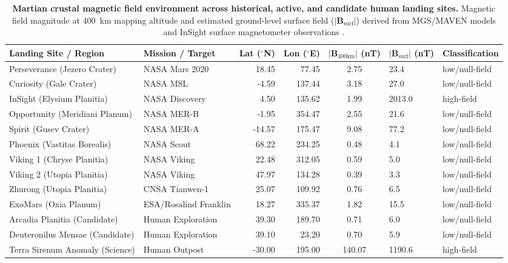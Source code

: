 \begin{table}[t]
\centering
\footnotesize
\caption{\textbf{Martian crustal magnetic field environment across historical, active, and candidate human landing sites.} Magnetic field magnitude at \SI{400}{\kilo\meter} mapping altitude and estimated ground-level surface field ($|\mathbf{B}_{\text{surf}}|$) derived from MGS/MAVEN models \citep{Langlais2019} and InSight surface magnetometer observations \citep{Johnson2020}.}
\label{tab:mars_landing_sites}
\begin{tabular}{llrrcll}
\toprule
\textbf{Landing Site / Region} & \textbf{Mission / Target} & \textbf{Lat ($^\circ$N)} & \textbf{Lon ($^\circ$E)} & \textbf{$|\mathbf{B}_{\text{400km}}|$ (nT)} & \textbf{$|\mathbf{B}_{\text{surf}}|$ (nT)} & \textbf{Classification} \\
\midrule
Perseverance (Jezero Crater) & NASA Mars 2020 & 18.45 & 77.45 & 2.75 & 23.4 & low/null-field \\
Curiosity (Gale Crater) & NASA MSL & -4.59 & 137.44 & 3.18 & 27.0 & low/null-field \\
InSight (Elysium Planitia) & NASA Discovery & 4.50 & 135.62 & 1.99 & 2013.0 & high-field \\
Opportunity (Meridiani Planum) & NASA MER-B & -1.95 & 354.47 & 2.55 & 21.6 & low/null-field \\
Spirit (Gusev Crater) & NASA MER-A & -14.57 & 175.47 & 9.08 & 77.2 & low/null-field \\
Phoenix (Vastitas Borealis) & NASA Scout & 68.22 & 234.25 & 0.48 & 4.1 & low/null-field \\
Viking 1 (Chryse Planitia) & NASA Viking & 22.48 & 312.05 & 0.59 & 5.0 & low/null-field \\
Viking 2 (Utopia Planitia) & NASA Viking & 47.97 & 134.28 & 0.39 & 3.3 & low/null-field \\
Zhurong (Utopia Planitia) & CNSA Tianwen-1 & 25.07 & 109.92 & 0.76 & 6.5 & low/null-field \\
ExoMars (Oxia Planum) & ESA/Rosalind Franklin & 18.27 & 335.37 & 1.82 & 15.5 & low/null-field \\
Arcadia Planitia (Candidate) & Human Exploration & 39.30 & 189.70 & 0.71 & 6.0 & low/null-field \\
Deuteronilus Mensae (Candidate) & Human Exploration & 39.10 & 23.20 & 0.70 & 5.9 & low/null-field \\
Terra Sirenum Anomaly (Science) & Human Outpost & -30.00 & 195.00 & 140.07 & 1190.6 & high-field \\
\bottomrule
\end{tabular}
\end{table}
